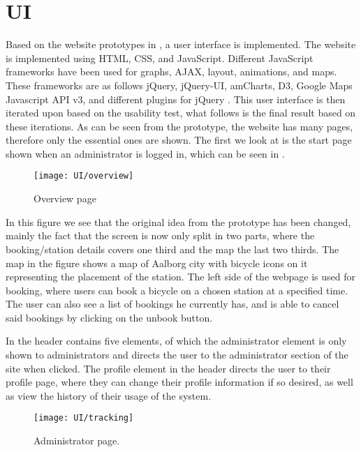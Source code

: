 \section{UI}

Based on the website prototypes in , a user interface is implemented.
The website is implemented using HTML, CSS, and JavaScript. 
Different JavaScript frameworks have been used for graphs, AJAX, layout, animations, and maps. 
These frameworks are as follows jQuery, jQuery-UI, amCharts, D3, Google Maps Javascript API v3, and different plugins for jQuery \citep{misc:googlehostedlibs, misc:d3js, misc:googlemapsapi, misc:amcharts}.
This user interface is then iterated upon based on the usability test, what follows is the final result based on these iterations. 
As can be seen from the prototype, the website has many pages, therefore only the essential ones are shown.
The first we look at is the start page shown when an administrator is logged in, which can be seen in .

\begin{figure}[h]
	\centering
	\texttt{[image: UI/overview]}
	\caption{Overview page}\label{fig:UI-overview}
\end{figure}

In this figure we see that the original idea from the prototype has been changed, mainly the fact that the screen is now only split in two parts, where the booking/station details covers one third and the map the last two thirds.
The map in the figure shows a map of Aalborg city with bicycle icons on it representing the placement of the station.
The left side of the webpage is used for booking, where users can book a bicycle on a chosen station at a specified time.
The user can also see a list of bookings he currently has, and is able to cancel said bookings by clicking on the unbook button.

In  the header contains five elements, of which the administrator element is only shown to administrators and directs the user to the administrator section of the site when clicked.
The profile element in the header directs the user to their profile page, where they can change their profile information if so desired, as well as view the history of their usage of the system.

\begin{figure}[h]
	\centering
	\texttt{[image: UI/tracking]}
	\caption{Administrator page.}\label{fig:UI-admin}
\end{figure}

